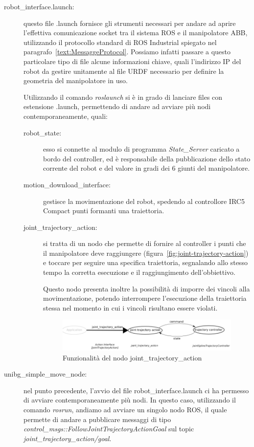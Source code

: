 \begin{description}
	\item[robot\_interface.launch:] questo file .launch fornisce gli strumenti necessari per andare ad aprire l'effettiva comunicazione socket tra il sistema ROS e il manipolatore ABB, utilizzando il protocollo standard di ROS Industrial spiegato nel paragrafo~\vref{text:MessaggeProtocol}. Possiamo infatti passare a questo particolare tipo di file alcune informazioni chiave, quali l'indirizzo IP del robot da gestire unitamente al file URDF necessario per definire la geometria del manipolatore in uso.
	
	Utilizzando il comando \emph{roslaunch} si è in grado di lanciare files con estensione .launch, permettendo di andare ad avviare più nodi contemporaneamente, quali:
	\begin{description}
		\item[robot\_state:] esso si connette al modulo di programma \emph{State\_Server} caricato a bordo del controller, ed è responsabile della pubblicazione dello stato corrente del robot e del valore in gradi dei 6 giunti del manipolatore. 
		\item[motion\_download\_interface:] gestisce la movimentazione del robot, spedendo al controllore IRC5 Compact punti formanti una traiettoria.
		\item[joint\_trajectory\_action:] si tratta di un nodo che permette di fornire al controller i punti che il manipolatore deve raggiungere (figura~\vref{fig:joint-trajectory-action}) e toccare per seguire una specifica traiettoria, segnalando allo stesso tempo la corretta esecuzione e il raggiungimento dell'obbiettivo.
		
		Questo nodo presenta inoltre la possibilità di imporre dei vincoli alla movimentazione, potendo interrompere l'esecuzione della traiettoria stessa nel momento in cui i vincoli risultano essere violati.  
		\begin{figure}[h]
			\centering
			\includegraphics[width=1\textwidth]{Immagini/joint_trajectory_action}
			\caption{Funzionalità del nodo joint\_trajectory\_action}
			\label{fig:joint-trajectory-action}
		\end{figure}
	\end{description} 
	\item[unibg\_simple\_move\_node:] nel punto precedente, l'avvio del file robot\_interface.launch ci ha permesso di avviare contemporaneamente più nodi. In questo caso, utilizzando il comando \emph{rosrun}, andiamo ad avviare un singolo nodo ROS, il quale permette di andare a pubblicare messaggi di tipo \emph{control\_msgs::FollowJointTrajectoryActionGoal} sul topic \emph{joint\_trajectory\_action/goal}.
	

\end{description}
